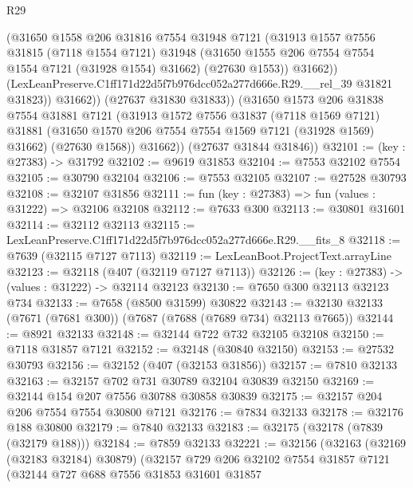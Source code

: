 \begin{lexlean}{R29}
\begin{coremodule}
                  (@31650
                    @1558
                    @206
                    @31816
                    @7554
                    @31948
                    @7121
                    (@31913
                      @1557
                      @7556
                      @31815
                      (@7118 @1554 @7121)
                      @31948
                      (@31650 @1555 @206 @7554 @7554 @1554 @7121 (@31928 @1554) @31662)
                      (@27630 @1553))
                    @31662))
                (LexLeanPreserve.C1ff171d22d5f7b976dcc052a277d666e.R29.__rel_39 @31821 @31823))
              @31662))
          (@27637 @31830 @31833))
        (@31650
          @1573
          @206
          @31838
          @7554
          @31881
          @7121
          (@31913
            @1572
            @7556
            @31837
            (@7118 @1569 @7121)
            @31881
            (@31650 @1570 @206 @7554 @7554 @1569 @7121 (@31928 @1569) @31662)
            (@27630 @1568))
          @31662))
      (@27637 @31844 @31846))
@32101 := (key : @27383) -> @31792
@32102 := @9619 @31853
@32104 := @7553 @32102 @7554
@32105 := @30790 @32104
@32106 := @7553 @32105
@32107 := @27528 @30793
@32108 := @32107 @31856
@32111 := fun (key : @27383) => fun (values : @31222) => @32106 @32108
@32112 := @7633 @300
@32113 := @30801 @31601
@32114 := @32112 @32113
@32115 := LexLeanPreserve.C1ff171d22d5f7b976dcc052a277d666e.R29.__fits_8
@32118 := @7639 (@32115 @7127 @7113)
@32119 := LexLeanBoot.ProjectText.arrayLine
@32123 := @32118 (@407 (@32119 @7127 @7113))
@32126 := (key : @27383) -> (values : @31222) -> @32114 @32123
@32130 := @7650 @300 @32113 @32123 @734
@32133 := @7658 (@8500 @31599) @30822
@32143 := @32130 @32133 (@7671 (@7681 @300)) (@7687 (@7688 (@7689 @734) @32113 @7665))
@32144 := @8921 @32133
@32148 := @32144 @722 @732 @32105 @32108
@32150 := @7118 @31857 @7121
@32152 := @32148 (@30840 @32150)
@32153 := @27532 @30793
@32156 := @32152 (@407 (@32153 @31856))
@32157 := @7810 @32133
@32163 := @32157 @702 @731 @30789 @32104 @30839 @32150
@32169 := @32144 @154 @207 @7556 @30788 @30858 @30839
@32175 := @32157 @204 @206 @7554 @7554 @30800 @7121
@32176 := @7834 @32133
@32178 := @32176 @188 @30800
@32179 := @7840 @32133
@32183 := @32175 (@32178 (@7839 (@32179 @188)))
@32184 := @7859 @32133
@32221 := @32156
    (@32163
      (@32169 (@32183 @32184) @30879)
      (@32157
        @729
        @206
        @32102
        @7554
        @31857
        @7121
        (@32144
          @727
          @688
          @7556
          @31853
          @31601
          @31857

\end{coremodule}
\end{lexlean}
